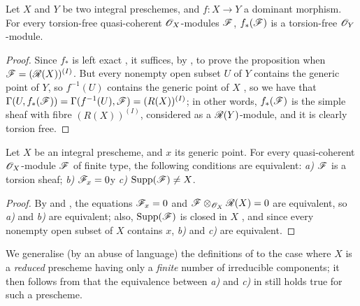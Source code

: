 \begin{prop}[7.4.5]
\label{1.7.4.5}
Let $X$ and $Y$ be two integral preschemes, and $f\colon X\to Y$ a dominant morphism.
For every torsion-free quasi-coherent $\mathscr{O}_X$-modules $\mathscr{F}$, $f_*(\mathscr{F})$ is a torsion-free $\mathscr{O}_Y$-module.
\end{prop}

\begin{proof}
\label{proof-1.7.4.5}
Since $f_*$ is left exact , it suffices, by , to prove the proposition when $\mathscr{F}=(\mathscr{R}(X))^{(I)}$.
But every nonempty open subset $U$ of $Y$ contains the generic point of $Y$, so $f^{-1}(U)$ contains the generic point of $X$ , so we have that $\Gamma(U,f_*(\mathscr{F})) = \Gamma(f^{-1}(U),\mathscr{F}) = (R(X))^{(I)}$; in other words, $f_*(\mathscr{F})$ is the simple sheaf with fibre $(R(X))^{(I)}$, considered as a $\mathscr{R}(Y)$-module, and it is clearly torsion free.
\end{proof}

\begin{prop}[7.4.6]
\label{1.7.4.6}
Let $X$ be an integral prescheme, and $x$ its generic point.
For every quasi-coherent $\mathscr{O}_X$-module $\mathscr{F}$ of finite type, the following conditions are equivalent: \emph{a)} $\mathscr{F}$ is a torsion sheaf; \emph{b)} $\mathscr{F}_x=0$y \emph{c)} ${\mathop{\mathrm{Supp}}\nolimits}(\mathscr{F})\neq X$.
\end{prop}

\begin{proof}
\label{proof-1.7.4.6}
By  and , the equations $\mathscr{F}_x=0$ and $\mathscr{F}\otimes_{\mathscr{O}_X}\mathscr{R}(X)=0$ are equivalent, so \emph{a)} and \emph{b)} are equivalent; also, ${\mathop{\mathrm{Supp}}\nolimits}(\mathscr{F})$ is closed in $X$ , and since every nonempty open subset of $X$ contains $x$, \emph{b)} and \emph{c)} are equivalent.
\end{proof}

\begin{env}[7.4.7]
\label{1.7.4.7}
We generalise (by an abuse of language) the definitions of  to the case where $X$ is a \emph{reduced} prescheme having only a \emph{finite} number of irreducible components; it then follows from  that the equivalence between \emph{a)} and \emph{c)} in  still holds true for such a prescheme.
\end{env}
